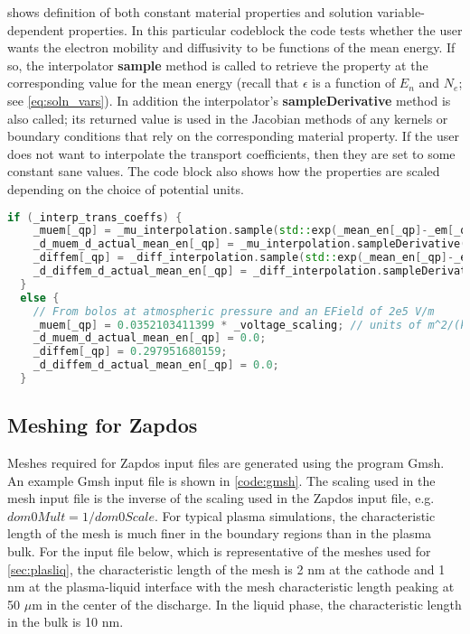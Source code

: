  shows definition of both constant material properties and solution variable-dependent properties. In this particular codeblock the code tests whether the user wants the electron mobility and diffusivity to be functions of the mean energy. If so, the interpolator \textbf{sample} method is called to retrieve the property at the corresponding value for the mean energy (recall that $\epsilon$ is a function of $E_n$ and $N_e$; see \cref{eq:soln_vars}). In addition the interpolator's \textbf{sampleDerivative} method is also called; its returned value is used in the Jacobian methods of any kernels or boundary conditions that rely on the corresponding material property. If the user does not want to interpolate the transport coefficients, then they are set to some constant sane values. The code block also shows how the properties are scaled depending on the choice of potential units.

\begin{lstlisting}[language=C++, caption = Material property definition, label = code:mat_def]
  if (_interp_trans_coeffs) {
    _muem[_qp] = _mu_interpolation.sample(std::exp(_mean_en[_qp]-_em[_qp])) * _voltage_scaling;
    _d_muem_d_actual_mean_en[_qp] = _mu_interpolation.sampleDerivative(std::exp(_mean_en[_qp]-_em[_qp])) * _voltage_scaling;
    _diffem[_qp] = _diff_interpolation.sample(std::exp(_mean_en[_qp]-_em[_qp]));
    _d_diffem_d_actual_mean_en[_qp] = _diff_interpolation.sampleDerivative(std::exp(_mean_en[_qp]-_em[_qp]));
  }
  else {
    // From bolos at atmospheric pressure and an EField of 2e5 V/m
    _muem[_qp] = 0.0352103411399 * _voltage_scaling; // units of m^2/(kV*s) if _voltage_scaling = 1000
    _d_muem_d_actual_mean_en[_qp] = 0.0;
    _diffem[_qp] = 0.297951680159;
    _d_diffem_d_actual_mean_en[_qp] = 0.0;
  }
\end{lstlisting}


\subsection{Meshing for Zapdos}
\label{sec:zap_meshing}

Meshes required for Zapdos input files are generated using the program Gmsh. \cite{geuzaine2009gmsh} An example Gmsh input file is shown in \cref{code:gmsh}. The scaling used in the mesh input file is the inverse of the scaling used in the Zapdos input file, e.g. $dom0Mult = 1/dom0Scale$. For typical plasma simulations, the characteristic length of the mesh is much finer in the boundary regions than in the plasma bulk. For the input file below, which is representative of the meshes used for \cref{sec:plasliq}, the characteristic length of the mesh is 2 nm at the cathode and 1 nm at the plasma-liquid interface with the mesh characteristic length peaking at 50 $\mu$m in the center of the discharge. In the liquid phase, the characteristic length in the bulk is 10 nm.

